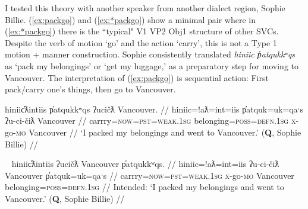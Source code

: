 I tested this theory with another speaker from another dialect region, Sophie Billie. (\ref{ex:packgo}) and (\ref{ex:*packgo}) show a minimal pair where in (\ref{ex:*packgo}) there is the ``typical" V1 VP2 Obj1 structure of other SVCs. Despite the verb of motion `go' and the action `carry', this is not a Type 1 motion + manner construction. Sophie consistently translated \textit{hiniic p̓atqukkʷqs} as `pack my belongings' or `get my luggage,' as a preparatory step for moving to Vancouver. The interpretation of (\ref{ex:packgo}) is sequential action: First pack/carry one's things, then go to Vancouver.

\ex \label{ex:packgo}
\begingl
\glpreamble hiniic̓ƛintiis p̓atqukkʷqs ʔucičƛ Vancouver. //
\gla hiniic=!aƛ=int=iis p̓atquk=uk=qaˑs ʔu-ci-čiƛ Vancouver //
\glb carrry=\textsc{now}=\textsc{pst}=\textsc{weak.1sg} belonging=\textsc{poss}=\textsc{defn.1sg} \textsc{x}-go-\textsc{mo} Vancouver //
\glft `I packed my belongings and went to Vancouver.' (\textbf{Q}, Sophie Billie) //
\endgl
\xe

\ex~ \label{ex:*packgo}
\begingl
\glpreamble hiniic̓ƛintiis ʔucičƛ Vancouver p̓atqukkʷqs. //
\gla hiniic=!aƛ=int=iis ʔu-ci-čiƛ Vancouver p̓atquk=uk=qaˑs //
\glb carrry=\textsc{now}=\textsc{pst}=\textsc{weak.1sg} \textsc{x}-go-\textsc{mo} Vancouver belonging=\textsc{poss}=\textsc{defn.1sg} //
\glft Intended: `I packed my belongings and went to Vancouver.' (\textbf{Q}, Sophie Billie) //
\endgl
\xe


\begin{comment}
actions performed while changing locations (e.g., carry + go as in \ref{ex:carryluggage}),

\ex~ \label{ex:carryluggage}
\begingl
\glpreamble hiniic̓aƛna p̓atquk ʔucačiƛ Qualicum. //
\gla hina-iic=!aƛ=naˑ p̓atquk ʔu-ca-čiƛ Qualicum //
\glb \textsc{empty}-carry=\textsc{now}=\textsc{strg.1pl} belongings \textsc{x}-go.to-\textsc{mo} Qualicum //
\glft `We are taking our belongings going to Qualicum.' (\textbf{C}, \textit{tupaat} Julia Lucas) //
\endgl
\xe 
\end{comment}


